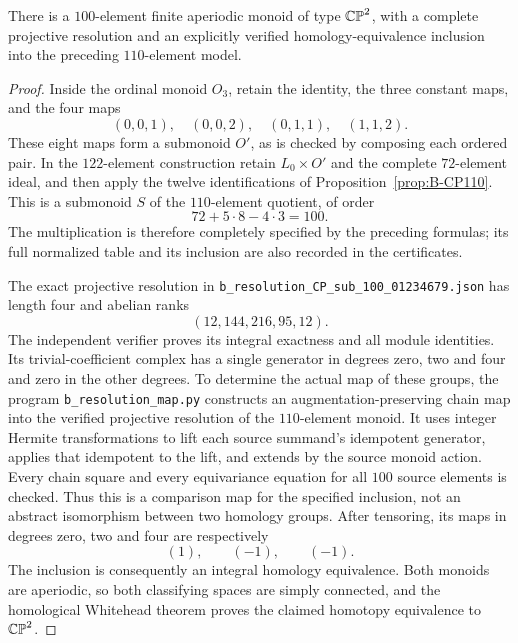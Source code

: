 \begin{proposition}\label{prop:B-CP100}
There is a $100$-element finite aperiodic monoid of type $\mathbb {CP}^2$,
with a complete projective resolution and an explicitly verified
homology-equivalence inclusion into the preceding $110$-element model.
\end{proposition}
\begin{proof}
Inside the ordinal monoid $O_3$, retain the identity, the three
constant maps, and the four maps
\[
 (0,0,1),\quad(0,0,2),\quad(0,1,1),\quad(1,1,2).
\]
These eight maps form a submonoid $O'$, as is checked by composing
each ordered pair.  In the $122$-element construction retain
$L_0\times O'$ and the complete $72$-element ideal, and then apply
the twelve identifications of Proposition~\ref{prop:B-CP110}.
This is a submonoid $S$ of the $110$-element quotient, of order
\[
 72+5\cdot8-4\cdot3=100.
\]
The multiplication is therefore completely specified by the preceding
formulas; its full normalized table and its inclusion are also
recorded in the certificates.

The exact projective resolution in
\texttt{b\_resolution\_CP\_sub\_100\_01234679.json}
has length four and abelian ranks
\[
 (12,144,216,95,12).
\]
The independent verifier proves its integral exactness and all module
identities.  Its trivial-coefficient complex has a single generator
in degrees zero, two and four and zero in the other degrees.
To determine the actual map of these groups, the program
\texttt{b\_resolution\_map.py} constructs an augmentation-preserving
chain map into the verified projective resolution of the $110$-element
monoid.  It uses integer Hermite transformations to lift each
source summand's idempotent generator, applies that idempotent to
the lift, and extends by the source monoid action.  Every chain
square and every equivariance equation for all $100$ source elements
is checked.  Thus this is a comparison map for the specified
inclusion, not an abstract isomorphism between two homology groups.
After tensoring, its maps in degrees zero, two and four are
respectively
\[
 (1),\qquad(-1),\qquad(-1).
\]
The inclusion is consequently an integral homology equivalence.
Both monoids are aperiodic, so both classifying spaces are simply
connected, and the homological Whitehead theorem proves the claimed
homotopy equivalence to $\mathbb {CP}^2$.
\end{proof}

